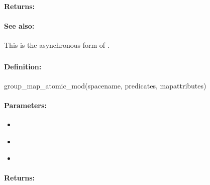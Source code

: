 \paragraph{Returns:}


\paragraph{See also:}  This is the asynchronous form of .

\pagebreak
\subsubsection{}
\label{api:ruby:group_map_atomic_mod}


\paragraph{Definition:}
\begin{rubycode}
group_map_atomic_mod(spacename, predicates, mapattributes)
\end{rubycode}

\paragraph{Parameters:}
\begin{itemize}[noitemsep]
\item {}\\

\item {}\\

\item {}\\

\end{itemize}

\paragraph{Returns:}


\pagebreak
\subsubsection{}
\label{api:ruby:async_group_map_atomic_mod}


